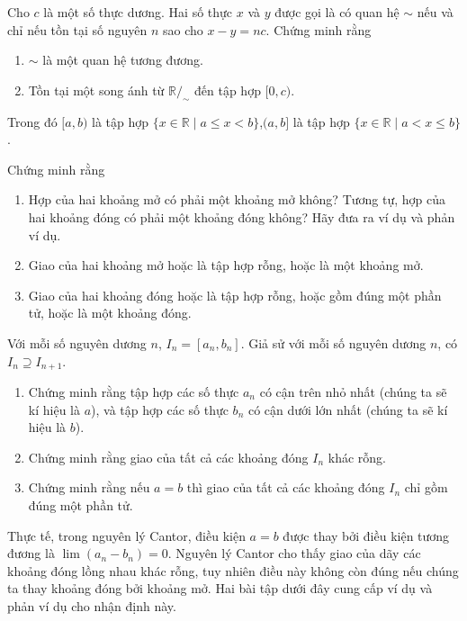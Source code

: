 \begin{exercise}
	Cho $c$ là một số thực dương. Hai số thực $x$ và $y$ được gọi là có quan hệ $\sim$ nếu và chỉ nếu tồn tại số nguyên $n$ sao cho $x - y = nc$. Chứng minh rằng
	\begin{enumerate}[label={(\roman*)}]
		\item $\sim$ là một quan hệ tương đương.
		\item Tồn tại một song ánh từ $\mathbb{R}/_{\sim}$ đến tập hợp $[0, c)$.
	\end{enumerate}

	Trong đó $[a, b)$ là tập hợp $\{ x\in\mathbb{R} \mid a\leq x < b \}$,$(a, b]$ là tập hợp $\{ x\in\mathbb{R} \mid a < x \leq b \}$.
\end{exercise}

\begin{exercise}
	Chứng minh rằng
	\begin{enumerate}[label={(\roman*)}]
		\item Hợp của hai khoảng mở có phải một khoảng mở không? Tương tự, hợp của hai khoảng đóng có phải một khoảng đóng không? Hãy đưa ra ví dụ và phản ví dụ.
		\item Giao của hai khoảng mở hoặc là tập hợp rỗng, hoặc là một khoảng mở.
		\item Giao của hai khoảng đóng hoặc là tập hợp rỗng, hoặc gồm đúng một phần tử, hoặc là một khoảng đóng.
	\end{enumerate}
\end{exercise}

\begin{exercise}
	Với mỗi số nguyên dương $n$, $I_{n} = [a_{n}, b_{n}]$. Giả sử với mỗi số nguyên dương $n$, có $I_{n} \supseteq I_{n+1}$.
	\begin{enumerate}[label={(\roman*)}]
		\item Chứng minh rằng tập hợp các số thực $a_{n}$ có cận trên nhỏ nhất (chúng ta sẽ kí hiệu là $a$), và tập hợp các số thực $b_{n}$ có cận dưới lớn nhất (chúng ta sẽ kí hiệu là $b$).
		\item Chứng minh rằng giao của tất cả các khoảng đóng $I_{n}$ khác rỗng.
		\item Chứng minh rằng nếu $a = b$ thì giao của tất cả các khoảng đóng $I_{n}$ chỉ gồm đúng một phần tử.
	\end{enumerate}
\end{exercise}

Thực tế, trong nguyên lý Cantor, điều kiện $a = b$ được thay bởi điều kiện tương đương là $\lim (a_{n} - b_{n}) = 0$. Nguyên lý Cantor cho thấy giao của dãy các khoảng đóng lồng nhau khác rỗng, tuy nhiên điều này không còn đúng nếu chúng ta thay khoảng đóng bởi khoảng mở. Hai bài tập dưới đây cung cấp ví dụ và phản ví dụ cho nhận định này.

